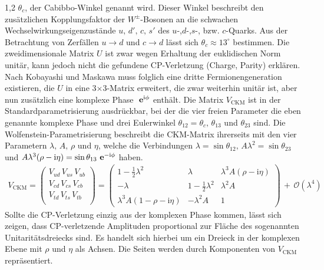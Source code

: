\documentclass[11pt,a4paper,twoside]{report}
\begin{document}
\begin{spacing}{1,2}
$\theta_c$, der Cabibbo-Winkel genannt wird. Dieser Winkel beschreibt den zusätzlichen Kopplungsfaktor der $W^\pm$-Bosonen an die schwachen 
Wechselwirkungseigenzustände $u,\, d',\,  c,\,  s'$ des $u$-,$d$-,$s$-, bzw. $c$-Quarks. Aus der Betrachtung von Zerfällen $u\rightarrow d$ und $c\rightarrow d$ lässt
sich $\theta_c \approx 13^\circ$ bestimmen. Die zweidimensionale Matrix $U$ ist zwar wegen Erhaltung der euklidischen Norm unitär, kann jedoch nicht die 
gefundene CP-Verletzung (Charge, Parity) erklären. Nach Kobayashi und Maskawa muss folglich eine dritte Fermionengeneration existieren,
die $U$ in eine 3$\times$3-Matrix erweitert, die zwar weiterhin unitär ist, aber nun zusätzlich eine komplexe Phase $\ \mathbf{e}^{\text{i}\phi}$ enthält. Die Matrix $V_{\text{CKM}}$ ist
in der Standardparametrisierung ausdrückbar, bei der die vier freien Parameter die eben genannte komplexe Phase und drei Eulerwinkel 
$\theta_{12} = \theta_c,\, \theta_{13}$ und $\theta_{23}$ sind. Die Wolfenstein-Parametrisierung beschreibt die CKM-Matrix ihrerseits mit den vier Parametern
$\lambda,\, A,\, \rho$ und $\eta$, welche die Verbindungen $\lambda = \sin\theta_{12},\, A\lambda^2 = \sin\theta_{23}$ und $A\lambda^3(\rho-\text{i}\eta) = \sin\theta_{13}\ \mathbf{e}^{-\text{i}\phi}$
haben.
\begin{align}
 V_{\text{CKM}} = \begin{pmatrix}
            V_{ud}\,V_{us}\,V_{ub}\\
            V_{cd}\,V_{cs}\,V_{cb}\\
            V_{td}\,V_{ts}\,V_{tb}\\
           \end{pmatrix} = \begin{pmatrix}
			    1-\frac12\lambda^2 & \lambda & \lambda^3A(\rho-\text{i}\eta)\\
			    -\lambda & 1-\frac12 \lambda^2 &\lambda^2A\\
			    \lambda^3A(1-\rho-\text{i}\eta) &-\lambda^2A & 1
			    \end{pmatrix} \, +  \, \mathcal{O}(\lambda^4)
\end{align}
Sollte die CP-Verletzung einzig aus der komplexen Phase kommen, lässt sich zeigen, dass CP-verletzende Amplituden proportional zur Fläche des sogenannten
Unitaritätsdreiecks sind. Es handelt sich hierbei um ein Dreieck in der komplexen Ebene mit $\rho$ und $\eta$ als Achsen. Die Seiten werden durch Komponenten
von $V_{\text{CKM}}$ repräsentiert.


\end{spacing}
\end{document}
